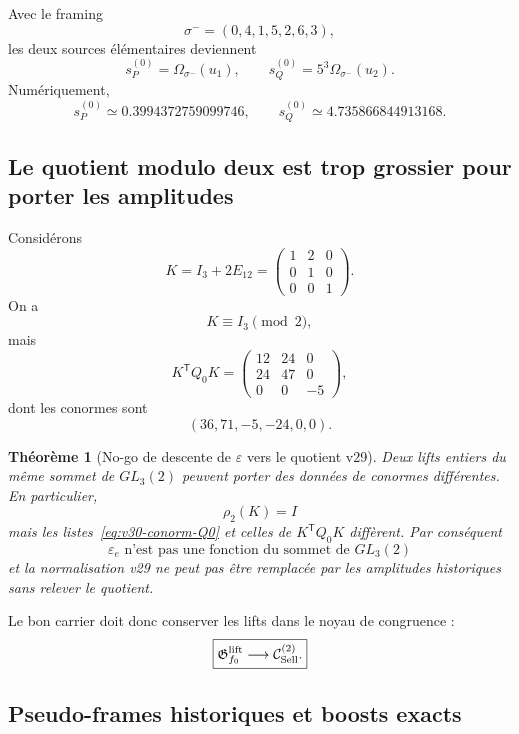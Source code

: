 \documentclass[11pt,a4paper]{article}
\newtheorem{theorem}{Théorème}[section]
\begin{document}
Avec le framing
\[
 \sigma^-=(0,4,1,5,2,6,3),
\]
les deux sources élémentaires deviennent
\[
 s_P^{(0)}
 =
 \Omega_{\sigma^-}(u_1),
 \qquad
 s_Q^{(0)}
 =
 5^3\Omega_{\sigma^-}(u_2).
\]
Numériquement,
\[
 \boxed{
 s_P^{(0)}
 \simeq0.3994372759099746,
 \qquad
 s_Q^{(0)}
 \simeq4.735866844913168.}
\]

\subsection{Le quotient modulo deux est trop grossier pour porter les amplitudes}

Considérons
\begin{equation}\label{eq:v30-Kkernel}
 K=I_3+2E_{12}
 =
 \begin{pmatrix}
 1&2&0\\
 0&1&0\\
 0&0&1
 \end{pmatrix}.
\end{equation}
On a
\[
 K\equiv I_3\pmod2,
\]
mais
\[
 K^{\mathsf T}Q_0K
 =
 \begin{pmatrix}
 12&24&0\\
 24&47&0\\
 0&0&-5
 \end{pmatrix},
\]
dont les conormes sont
\[
 \boxed{
 (36,71,-5,-24,0,0).}
\]

\begin{theorem}[No-go de descente de \texorpdfstring{$\varepsilon$}{epsilon} vers le quotient v29]\label{thm:v30-epsilon-not-descend}
Deux lifts entiers du même sommet de $GL_3(2)$ peuvent porter des données de conormes différentes. En particulier,
\[
 \rho_2(K)=I
\]
mais les listes~\eqref{eq:v30-conorm-Q0} et celles de $K^{\mathsf T}Q_0K$ diffèrent. Par conséquent
\[
 \boxed{
 \varepsilon_e
 \text{ n'est pas une fonction du sommet de }GL_3(2)
 }
\]
et la normalisation v29 ne peut pas être remplacée par les amplitudes historiques sans relever le quotient.
\end{theorem}

Le bon carrier doit donc conserver les lifts dans le noyau de congruence :
\[
 \boxed{
 \mathfrak G_{f_0}^{\rm lift}
 \longrightarrow
 \mathcal C_{\rm Sell}^{(2)}.}
\]

\subsection{Pseudo-frames historiques et boosts exacts}
\end{document}
